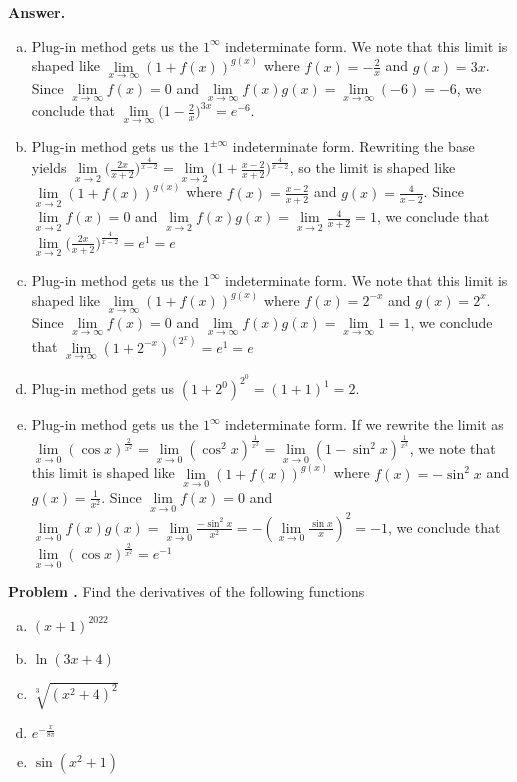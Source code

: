 \documentclass[11pt,letterpaper]{article}
\newcounter{problem}
\newcommand{\problem}{
	\stepcounter{problem}%
	\noindent \textbf{Problem \theproblem. }%
}
\newcommand{\answer}{\noindent \textbf{Answer. }}
\begin{document}
\answer
\begin{enumerate}[(a)]
    \item Plug-in method gets us the $1^\infty$ indeterminate form.  We note that this limit is shaped like $\lim\limits_{x \to \infty} (1+f(x))^{g(x)}$ where $f(x) = -\frac{2}{x}$ and $g(x) = 3x$.  Since $\lim\limits_{x \to \infty} f(x) = 0$ and $\lim\limits_{x \to \infty} f(x)g(x) = \lim\limits_{x \to \infty} (-6) = -6$, we conclude that $\lim\limits_{x \to \infty} \big(1-\frac{2}{x}\big)^{3x} = e^{-6}$.
    \item Plug-in method gets us the $1^{\pm\infty}$ indeterminate form.  Rewriting the base yields $\lim\limits_{x \to 2} \big(\frac{2x}{x+2}\big)^{\frac{4}{x-2}} = \lim\limits_{x \to 2} \big(1+\frac{x-2}{x+2}\big)^{\frac{4}{x-2}}$, so the limit is shaped like $\lim\limits_{x \to 2} (1+f(x))^{g(x)}$ where $f(x) = \frac{x-2}{x+2}$ and $g(x) = \frac{4}{x-2}$. Since $\lim\limits_{x \to 2} f(x) = 0$ and $\lim\limits_{x \to 2} f(x)g(x) = \lim\limits_{x \to 2} \frac{4}{x+2} = 1$, we conclude that $\lim\limits_{x \to 2} \big(\frac{2x}{x+2}\big)^{\frac{4}{x-2}} = e^1 = e$
    \item Plug-in method gets us the $1^\infty$ indeterminate form.  We note that this limit is shaped like $\lim\limits_{x \to \infty} (1+f(x))^{g(x)}$ where $f(x) = 2^{-x}$ and $g(x) = 2^x$. Since $\lim\limits_{x \to \infty} f(x) = 0$ and $\lim\limits_{x \to \infty} f(x)g(x) = \lim\limits_{x \to \infty} 1 = 1$, we conclude that $\lim\limits_{x \to \infty} (1+2^{-x})^{\left(2^x\right)} = e^1 = e$
    \item Plug-in method gets us $(1+2^0)^{2^0} = (1+1)^1 = 2$. 
    \item Plug-in method gets us the $1^\infty$ indeterminate form.  If we rewrite the limit as 
    $\lim\limits_{x \to 0} (\cos x)^{\frac{2}{x^2}} = \lim\limits_{x \to 0} (\cos^2 x)^{\frac{1}{x^2}} = \lim\limits_{x \to 0} (1-\sin^2 x)^{\frac{1}{x^2}}$, we note that this limit is shaped like $\lim\limits_{x \to 0} (1+f(x))^{g(x)}$ where $f(x) = -\sin^2 x$ and $g(x) = \frac{1}{x^2}$.  Since $\lim\limits_{x \to 0} f(x) = 0$ and $\lim\limits_{x \to 0} f(x)g(x) = \lim\limits_{x \to 0} \frac{-\sin^2 x}{x^2} = -\left(\lim\limits_{x \to 0} \frac{\sin x}{x}\right)^2 = -1$, we conclude that $\lim\limits_{x \to 0} (\cos x)^{\frac{2}{x^2}} = e^{-1}$
\end{enumerate}\vspace{4mm}

\problem Find the derivatives of the following functions
\begin{enumerate}[(a)]
    \item $(x+1)^{2022}$
    \item $\ln(3x+4)$
    \item $\sqrt[3]{(x^2+4)^2}$
    \item $e^{-\frac{x}{8\pi}}$
    \item $\sin(x^2+1)$
\end{enumerate}\vspace{4mm}
\end{document}
